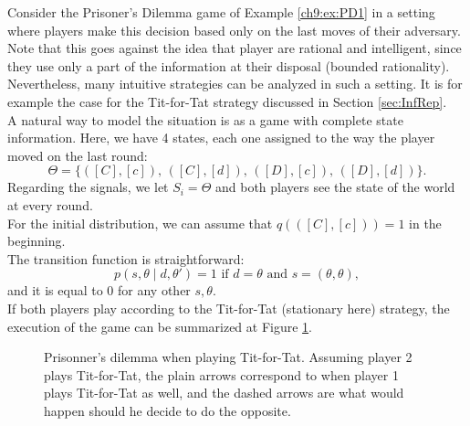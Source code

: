 \begin{example}
Consider the Prisoner's Dilemma game of Example \ref{ch9:ex:PD1} in a setting where players make this decision based only on the last moves of their adversary.
Note that this goes against the idea that player are rational and intelligent, since they use only a part of the information at their disposal (bounded rationality).
Nevertheless, many intuitive strategies can be analyzed in such a setting. It is for example the case for the Tit-for-Tat strategy discussed in Section \ref{sec:InfRep}.\\
A natural way to model the situation is as a game with complete state information.
Here, we have 4 states, each one assigned to the way the player moved on the last round:
$$ \Theta = \{([C],[c]), \,  ([C],[d]), \, ([D],[c]), \, ([D], [d]) \}. $$
Regarding the signals, we let $S_i = \Theta $ and both players see the state of the world at every round.\\
For the initial distribution, we can assume that $q( ([C],[c]) ) = 1$ in the beginning. \\
The transition function is straightforward:
$$ p(s, \theta \mid d, \theta') = 1 \text{ if } d = \theta \text{ and } s = (\theta,\theta), $$
and it is equal to $0$ for any other $s, \theta$.\\
If both players play according to the Tit-for-Tat (stationary here) strategy, the execution of the game can be summarized at Figure \ref{fig:Tit-for-Tat}.
\begin{figure}[!ht]
\centering
{}
\caption{Prisonner's dilemma when playing Tit-for-Tat. Assuming player 2 plays Tit-for-Tat, the plain arrows correspond to when player 1 plays Tit-for-Tat as well, and the dashed arrows are what would happen should he decide to do the opposite.}
\label{fig:Tit-for-Tat}
\end{figure}
\label{ex:stationaryGame}
\end{example}

